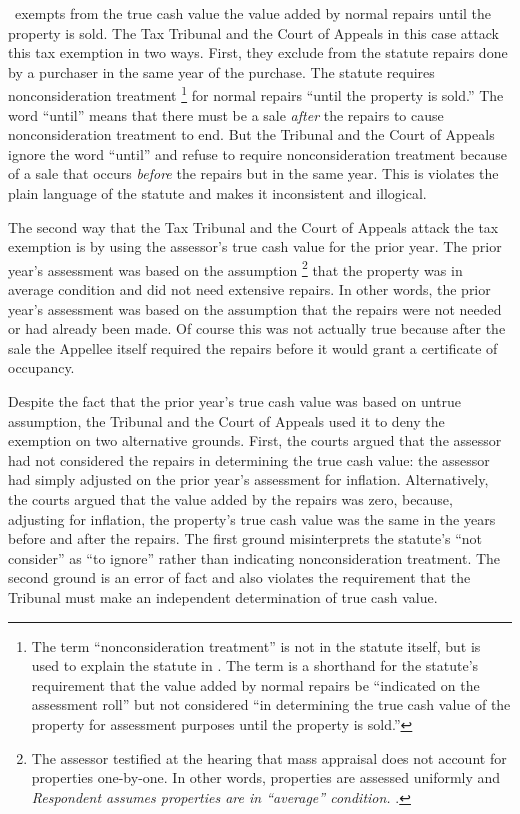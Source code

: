 \documentclass[12pt,\documentclassflag]{michiganCourtOfAppealsBrief}
\makeatletter
\newcommand\footnoteref[1]{\protected@xdef\@thefnmark{\ref{#1}}\@footnotemark}
\makeatother
\begin{document}
\mathieuGast\ exempts from the true cash value the value added by normal repairs until the property is sold. The Tax Tribunal and the Court of Appeals in this case attack this tax exemption
in two ways. First, they exclude from the statute repairs done by a purchaser in the same year of the purchase. The statute requires nonconsideration treatment%
\footnote{\label{nonconsiderationTreatmentFn}The term ``nonconsideration treatment'' is not in the statute itself, but is used to explain the statute in \cite{STC Bulletin}. The term is a shorthand for the statute's requirement that the value added by normal repairs be ``indicated on the assessment roll'' but not considered ``in determining the true cash value of the property for assessment purposes until the property is sold.''}
for normal repairs ``until the property is sold.'' The word ``until'' means that there must be a sale \emph{after} the repairs to cause nonconsideration treatment to end. But the Tribunal and the Court of Appeals ignore the word ``until'' and refuse to require nonconsideration treatment because of a sale that occurs \emph{before} the repairs but in the same year. This is violates the plain language of the statute and makes it inconsistent and illogical. 

The second way that the Tax Tribunal and the Court of Appeals attack the tax exemption is by using the assessor's true cash value for the prior year. The prior year's assessment was based on the assumption%
\footnote{The assessor testified at the hearing that mass appraisal does not account for properties one-by-one. In other words, properties are assessed uniformly and \emph{Respondent assumes properties are in ``average'' condition.} \foj[4].}
that the property was in average condition and did not need extensive repairs.%
In other words, the prior year's assessment was based on the assumption that the repairs were not needed or had already been made. Of course this was not actually true because after the sale the Appellee itself required the repairs before it would grant a certificate of occupancy.

Despite the fact that the prior year's true cash value was based on untrue assumption, the Tribunal and the Court of Appeals used it to deny the exemption on two alternative grounds. First, the courts argued that the assessor had not considered the repairs in determining the true cash value: the assessor had simply adjusted on the prior year's assessment for inflation. Alternatively, the courts argued that the value added by the repairs was zero, because, adjusting for inflation, the property's true cash value was the same in the years before and after the repairs. The first ground misinterprets the statute's ``not consider'' as ``to ignore'' rather than indicating nonconsideration treatment.\footnoteref{nonconsiderationTreatmentFn} The second ground is an error of fact and also violates the requirement that the Tribunal must make an independent determination of true cash value.
\end{document}
